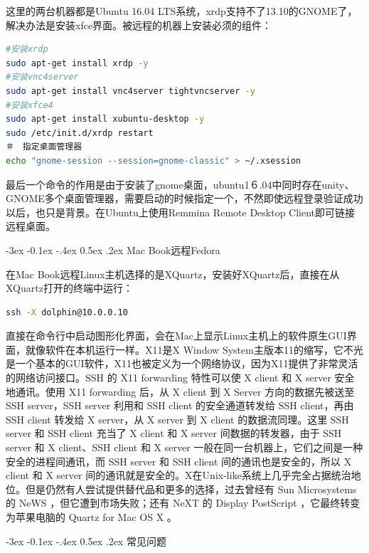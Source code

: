 \documentclass[11pt,fleqn]{book}
\makeatletter
\numberwithin{dummy}{section}
\theoremstyle{ocrenumbox}
\theoremstyle{blacknumex}
\theoremstyle{blacknumbox}
\theoremstyle{ocrenum}
\renewcommand{\subsection}{\@startsection {subsection}{2}{\z@}
	{-3ex \@plus -0.1ex \@minus -.4ex}
	{0.5ex \@plus.2ex }
	{\normalfont\sffamily\bfseries}}
\makeatother
\begin{document}
这里的两台机器都是Ubuntu 16.04 LTS系统，xrdp支持不了13.10的GNOME了，解决办法是安装xfce界面。被远程的机器上安装必须的组件：

\begin{lstlisting}[language=Bash]
#安装xrdp
sudo apt-get install xrdp -y
#安装vnc4server
sudo apt-get install vnc4server tightvncserver -y
#安装xfce4
sudo apt-get install xubuntu-desktop -y
sudo /etc/init.d/xrdp restart
＃　指定桌面管理器
echo "gnome-session --session=gnome-classic" > ~/.xsession
\end{lstlisting}

最后一个命令的作用是由于安装了gnome桌面，ubuntu1６.04中同时存在unity、GNOME多个桌面管理器，需要启动的时候指定一个，不然即使远程登录验证成功以后，也只是背景。在Ubuntu上使用Remmina Remote Desktop Client即可链接远程桌面。

\subsection{Mac Book远程Fedora}

在Mac Book远程Linux主机选择的是XQuartz，安装好XQuartz后，直接在从XQuartz打开的终端中运行：

\begin{lstlisting}[language=Bash]
ssh -X dolphin@10.0.0.10
\end{lstlisting}

直接在命令行中启动图形化界面，会在Mac上显示Linux主机上的软件原生GUI界面，就像软件在本机运行一样。X11是X Window System主版本11的缩写，它不光是一个基本的GUI软件，X11也被定义为一个网络协议，因为X11提供了非常灵活的网络访问接口。SSH 的 X11 forwarding 特性可以使 X client 和 X server 安全地通讯。使用 X11 forwarding 后，从 X client 到 X Server 方向的数据先被送至 SSH server，SSH server 利用和 SSH client 的安全通道转发给 SSH client，再由 SSH client 转发给 X server，从 X server 到 X client 的数据流同理。这里 SSH server 和 SSH client 充当了 X client 和 X server 间数据的转发器，由于 SSH server 和 X client、SSH client 和 X server 一般在同一台机器上，它们之间是一种安全的进程间通讯，而 SSH server 和 SSH client 间的通讯也是安全的，所以 X client 和 X server 间的通讯就是安全的。X在Unix-like系统上几乎完全占据统治地位。但是仍然有人尝试提供替代品和更多的选择，过去曾经有 Sun Microsystems 的 NeWS ，但它遭到市场失败；还有 NeXT 的 Display PostScript ，它最终转变为苹果电脑的 Quartz for Mac OS X 。

\subsection{常见问题}
\end{document}

